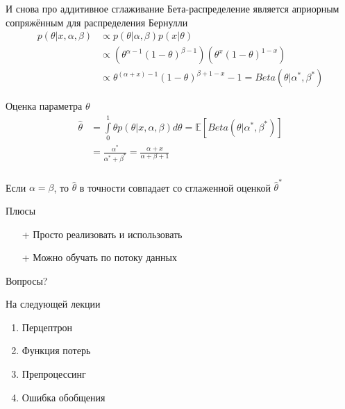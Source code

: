 \documentclass[10pt]{beamer}
\begin{document}
\begin{frame}{И снова про аддитивное сглаживание}
  Бета-распределение является априорным сопряжённым для распределения Бернулли\\  
  \begin{equation*}
    \begin{split}
    p(\theta | x, \alpha, \beta) & \propto p(\theta|\alpha, \beta) p(x|\theta) \\
      & \propto (\theta^{\alpha-1} (1-\theta)^{\beta-1})(\theta^x (1-\theta)^{1-x}) \\
      & \propto \theta^{(\alpha+x)-1} (1-\theta)^{\beta+1-x}-1 = Beta(\theta| \alpha^*, \beta^*)
    \end{split}
  \end{equation*}
\end{frame}

\begin{frame}{Оценка параметра $\theta$}
  \begin{equation*}
    \begin{split}
      \hat{\theta} &= \int\limits_{0}^1 \theta p(\theta|x, \alpha, \beta) d\theta  = \mathbb{E} [Beta(\theta|\alpha^*, \beta^*)]\\
      & = \frac{\alpha^*}{\alpha^*+\beta^*} = \frac{\alpha+x}{\alpha + \beta + 1}
    \end{split}
  \end{equation*}\\
  Если $\alpha = \beta$, то $\hat{\theta}$ в точности совпадает со сглаженной оценкой $\hat{\theta}^*$  
\end{frame}

\begin{frame}{Плюсы}
  \begin{itemize} [<+->]
    \item[+] Просто реализовать и использовать
    \item[+] Можно обучать по потоку данных
  \end{itemize}
\end{frame}

\begin{frame}[standout]
  Вопросы?
\end{frame}

\appendix

\begin{frame}{На следующей лекции}
  	\begin{enumerate} [--]
		\item Перцептрон
		\item Функция потерь
		\item Препроцессинг
		\item Ошибка обобщения
	\end{enumerate}
\end{frame}
\end{document}
